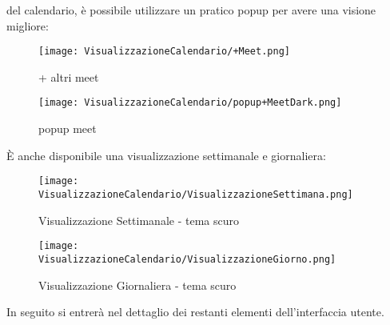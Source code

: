 del calendario, è possibile utilizzare un pratico popup per avere una visione migliore:
\begin{figure}[H]
    \centering
    \begin{minipage}{0.45\textwidth}
        \centering
        \texttt{[image: VisualizzazioneCalendario/+Meet.png]}
        \caption{+ altri meet}
    \end{minipage}
    \hspace{0.05\textwidth}
    \begin{minipage}{0.45\textwidth}
        \centering
        \texttt{[image: VisualizzazioneCalendario/popup+MeetDark.png]}
        \caption{popup meet}
    \end{minipage}
\end{figure}
\clearpage
\noindent È anche disponibile una visualizzazione settimanale e giornaliera:
\begin{figure}[H]
    \centering
    \texttt{[image: VisualizzazioneCalendario/VisualizzazioneSettimana.png]}
    \caption{Visualizzazione Settimanale - tema scuro}
\end{figure}
\begin{figure}[H]
    \centering
    \texttt{[image: VisualizzazioneCalendario/VisualizzazioneGiorno.png]}
    \caption{Visualizzazione Giornaliera - tema scuro}
\end{figure}
\noindent In seguito si entrerà nel dettaglio dei restanti elementi dell'interfaccia utente.